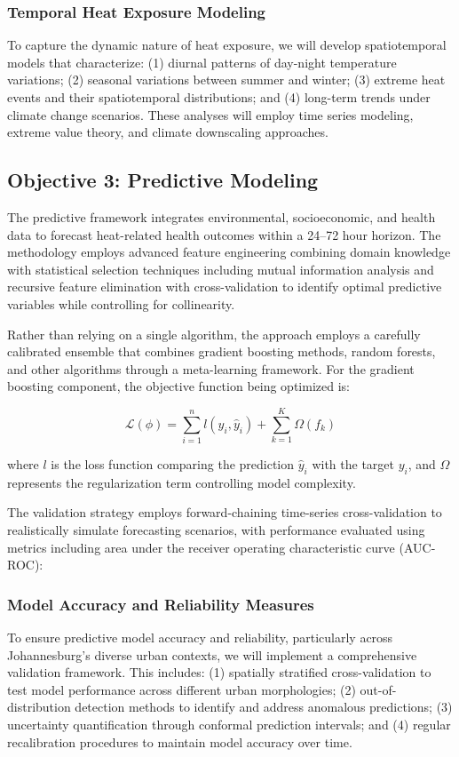 \subsubsection{Temporal Heat Exposure Modeling}
To capture the dynamic nature of heat exposure, we will develop spatiotemporal models that characterize: (1) diurnal patterns of day-night temperature variations; (2) seasonal variations between summer and winter; (3) extreme heat events and their spatiotemporal distributions; and (4) long-term trends under climate change scenarios. These analyses will employ time series modeling, extreme value theory, and climate downscaling approaches.

\subsection{Objective 3: Predictive Modeling}
The predictive framework integrates environmental, socioeconomic, and health data to forecast heat-related health outcomes within a 24--72 hour horizon. The methodology employs advanced feature engineering combining domain knowledge with statistical selection techniques including mutual information analysis and recursive feature elimination with cross-validation to identify optimal predictive variables while controlling for collinearity.

Rather than relying on a single algorithm, the approach employs a carefully calibrated ensemble that combines gradient boosting methods, random forests, and other algorithms through a meta-learning framework. For the gradient boosting component, the objective function being optimized is:

\begin{equation}
\mathcal{L}(\phi) = \sum^n_{i=1} l(y_i, \hat{y}_i) + \sum^K_{k=1} \Omega(f_k)
\end{equation}

where $l$ is the loss function comparing the prediction $\hat{y}_i$ with the target $y_i$, and $\Omega$ represents the regularization term controlling model complexity.

The validation strategy employs forward-chaining time-series cross-validation to realistically simulate forecasting scenarios, with performance evaluated using metrics including area under the receiver operating characteristic curve (AUC-ROC):

\subsubsection{Model Accuracy and Reliability Measures}
To ensure predictive model accuracy and reliability, particularly across Johannesburg's diverse urban contexts, we will implement a comprehensive validation framework. This includes: (1) spatially stratified cross-validation to test model performance across different urban morphologies; (2) out-of-distribution detection methods to identify and address anomalous predictions; (3) uncertainty quantification through conformal prediction intervals; and (4) regular recalibration procedures to maintain model accuracy over time. 

